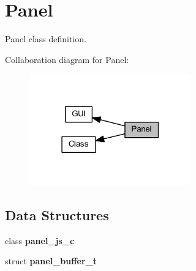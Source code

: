 \section{Panel}
\label{group___panel}


Panel class definition.  


Collaboration diagram for Panel\+:
\nopagebreak
\begin{figure}[H]
\begin{center}
\leavevmode
\includegraphics[width=198pt]{group___panel}
\end{center}
\end{figure}
\subsection*{Data Structures}
\begin{DoxyCompactItemize}
\item 
class \textbf{ panel\+\_\+js\+\_\+c}
\item 
struct \textbf{ panel\+\_\+buffer\+\_\+t}
\end{DoxyCompactItemize}
